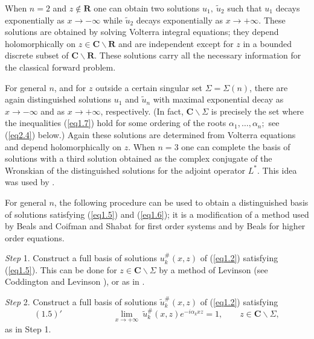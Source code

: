 \documentclass{surv-l}
\theoremstyle{plain}
\theoremstyle{definition}
\numberwithin{equation}{chapter}
\begin{document}
When $n=2$ and $z\not\in \mathbf{R}$ one can obtain two solutions $u_{1},\ \tilde{u}_{2}$ such that $u_{1}$ decays exponentially as $ x\rightarrow-\infty$ while $\tilde{u}_{2}$ decays exponentially as $ x\rightarrow+\infty$. These solutions are obtained by solving Volterra integral equations; they depend holomorphically on $z\in \mathbf{C}\backslash \mathbf{R}$ and are independent except for $z$ in a bounded discrete subset of $\mathbf{C}\backslash \mathbf{R}$. These solutions carry all the necessary information for the classical forward problem.

For general $n$, and for $z$ outside a certain singular set $\Sigma=\Sigma(n)$, there are again distinguished solutions $u_{1}$ and $\tilde{u}_{n}$ with maximal exponential decay as $ x\rightarrow-\infty$ and as $ x\rightarrow+\infty$, respectively. (In fact, $ \mathbf{C}\backslash \Sigma$ is precisely the set where the inequalities (\ref{eq1.7}) hold for some ordering of the roots $\alpha_{1}, \ldots, \alpha_{n};$ see (\ref{eq2.4}) below.) Again these solutions are determined from Volterra equations and depend holomorphically on $z$. When $n=3$ one can complete the basis of solutions with a third solution obtained as the complex conjugate of the Wronskian of the distinguished solutions for the adjoint operator $L^{*}$. This idea was used by \cite{DTT, Ka, McK}.

For general $n$, the following procedure can be used to obtain a distinguished basis of solutions satisfying (\ref{eq1.5}) and (\ref{eq1.6}); it is a modification of a method used by Beals and Coifman \cite{BC1} and Shabat \cite{Sh} for first order systems and by Beals \cite{Be} for higher order equations.

\emph{Step} 1. Construct a full basis of solutions $u_{k}^{\#}(x,z)$ of (\ref{eq1.2}) satisfying (\ref{eq1.5}). This can be done for $ z\in \mathbf{C}\backslash \Sigma$ by a method of Levinson (see Coddington and Levinson \cite[p. 104, problem 29]{CL}), or as in \cite{Be, BC1}.

\emph{Step} 2. Construct a full basis of solutions $\tilde{u}_{k}^{\#}(x,z)$ of (\ref{eq1.2}) satisfying
\begin{equation*}
(1.5)'\qquad\qquad \qquad\lim_{x\rightarrow+\infty}\ \tilde{u}_{k}^{\#}(x,z)e^{-i\alpha_{k}xz}=1,\qquad  z\in \mathbf{C}\backslash \Sigma,
\end{equation*}
as in Step 1.
\end{document}
